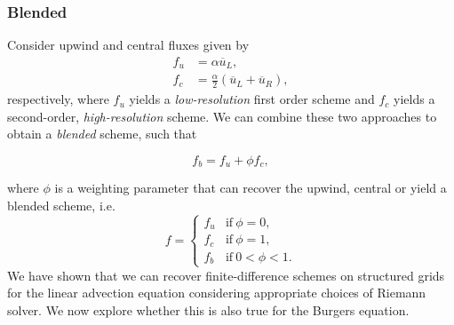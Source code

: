\subsubsection{Blended}
Consider upwind and central fluxes given by
\begin{align}
 f_u & = \alpha \overline u_L, \\
 f_c & = \frac{\alpha}{2} \left(\overline u_L + \overline u_R \right),
\end{align}
respectively, where $f_u$ yields a \textit{low-resolution} first order scheme and $f_c$ yields a second-order, \textit{high-resolution} scheme. We can combine these two approaches to obtain a \textit{blended} scheme, such that
\begin{eqBox}
\begin{equation}
 f_b = f_u + \phi f_c,
\end{equation}
\end{eqBox}
where $\phi$ is a weighting parameter that can recover the upwind, central or yield a blended scheme, i.e.
\[
 f = 
\begin{cases}
 f_u & \text{if}~\phi = 0, \\
 f_c & \text{if}~\phi = 1, \\ 
 f_b & \text{if}~0 < \phi < 1. 
\end{cases}
\]
We have shown that we can recover finite-difference schemes on structured grids for the linear advection equation considering appropriate choices of Riemann solver. We now explore whether this is also true for the Burgers equation.
